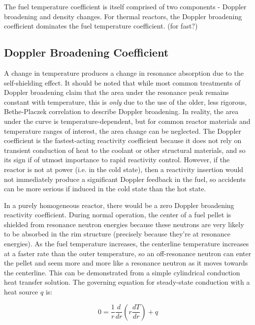 \documentclass[10pt]{article}
\begin{document}
\begin{flushleft}
The fuel temperature coefficient is itself comprised of two components - Doppler broadening and density changes. For thermal reactors, the Doppler broadening coefficient dominates the fuel temperature coefficient. (for fast?)

\subsection{Doppler Broadening Coefficient}

A change in temperature produces a change in resonance absorption due to the self-shielding effect. It should be noted that while most common treatments of Doppler broadening claim that the area under the resonance peak remains constant with temperature, this is \textit{only} due to the use of the older, less rigorous, Bethe-Placzek correlation to describe Doppler broadening. In reality, the area under the curve is temperature-dependent, but for common reactor materials and temperature ranges of interest, the area change can be neglected. The Doppler coefficient is the fastest-acting reactivity coefficient because it does not rely on transient conduction of heat to the coolant or other structural materials, and so its sign if of utmost importance to rapid reactivity control. However, if the reactor is not at power (i.e. in the cold state), then a reactivity insertion would not immediately produce a significant Doppler feedback in the fuel, so accidents can be more serious if induced in the cold state than the hot state. 

In a purely homogeneous reactor, there would be a zero Doppler broadening reactivity coefficient. During normal operation, the center of a fuel pellet is shielded from resonance neutron energies because these neutrons are very likely to be absorbed in the rim structure (precisely because they're at resonance energies). As the fuel temperature increases, the centerline temperature increases at a faster rate than the outer temperature, so an off-resonance neutron can enter the pellet and seem more and more like a resonance neutron as it moves towards the centerline. This can be demonstrated from a simple cylindrical conduction heat transfer solution. The governing equation for steady-state conduction with a heat source \(q\) is:

\begin{equation}
\label{eq:ConductionHeatTransfer}
0=\frac{1}{r}\frac{d}{dr}\left(r\frac{dT}{dr}\right) + q
\end{equation}


\end{flushleft}
\end{document}
